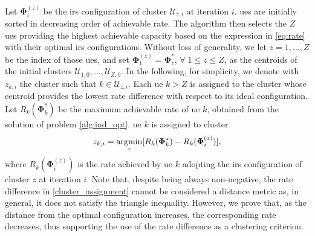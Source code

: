 Let $\bm{\Phi}^{(z)}_{i}$ be the \gls{irs} configuration of cluster $\mathcal{U}_{z, i}$ at iteration $i$.
\glspl{ue} are initially sorted in decreasing order of achievable rate. The algorithm then selects the $Z$ \glspl{ue} providing the highest achievable capacity based on the expression in \eqref{eq:rate} with their optimal \gls{irs} configurations. Without loss of generality, we let $z=1, \dots, Z$ be the index of those \glspl{ue}, and set $\bm{\Phi}_1^{(z)} = \bm{\Phi}^*_z$, $\forall\; 1\leq z\leq Z$, as the centroids of the initial clusters $\mathcal{U}_{1, 0}, \ldots, \mathcal{U}_{Z, 0}$. 
In the following, for simplicity, we denote with $z_{k, i}$ the cluster such that $k \in \mathcal{U}_{z, i}$.
Each \gls{ue} $k > Z$ is assigned to the cluster whose centroid provides the lowest rate difference with respect to its ideal configuration. Let $R_k(\bm{\Phi}^*_k)$ be the maximum achievable rate of \gls{ue} $k$, obtained from the solution of problem \eqref{alg:ind_opt}. \gls{ue} $k$ is assigned to cluster
\begin{equation}
\label{cluster_assignment}
    z_{k, i} = \operatorname*{\arg\!\min}_{\substack{z}} [R_k(\bm{\Phi}^*_k) - R_k(\bm{\Phi}^{(z)}_{i})] , 
\end{equation}
where $R_k(\bm{\Phi}^{(z)}_i)$ is the rate achieved by \gls{ue} $k$ adopting the \gls{irs} configuration of cluster $z$ at iteration $i$.
Note that, despite being always non-negative, the rate difference in \eqref{cluster_assignment} cannot be considered a distance metric as, in general, it does not satisfy the triangle inequality.
However, we prove that, as the distance from the optimal configuration increases, the corresponding rate decreases, thus supporting the use of the rate difference as a clustering criterion.


